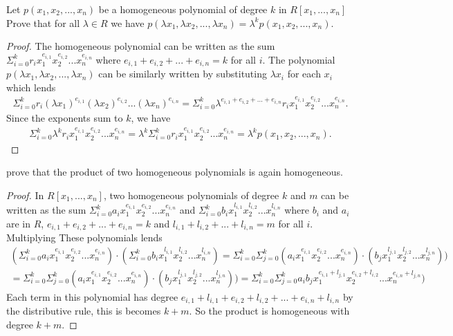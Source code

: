 \documentclass[10pt]{article}
\newenvironment{problem}[2][Problem]{\begin{trivlist}
		\item[\hskip \labelsep {\bfseries #1}\hskip \labelsep {\bfseries #2.}]}{\end{trivlist}}
\begin{document}
	\begin{problem}{1.15}
		Let $p(x_1, x_2, ..., x_n)$ be a homogeneous polynomial of degree $k$ in $R[x_1, ..., x_n]$ Prove that for all $
		\lambda \in R$ we have $p(\lambda x_1, \lambda x_2, ..., \lambda x_n) = \lambda^k p(x_1, x_2, ..., x_n)$.
		
		\begin{proof}
			The homogeneous polynomial can be written as the sum $\Sigma^k_{i=0} r_i x_1^{e_{i,1}} x_2^{e_{i,2}} ... x_n^{e_{i,n}}$ where ${e_{i,1}} + {e_{i,2}} + ... + {e_{i,n}} = k$ for all $i$. The polynomial $p(\lambda x_1, \lambda x_2, ..., \lambda x_n)$ can be similarly written by substituting $\lambda x_i$ for each $x_i$ which lends 
			\begin{align*}
				\Sigma^k_{i=0} r_i (\lambda x_1)^{e_{i,1}} (\lambda x_2)^{e_{i,2}} ... (\lambda x_n)^{e_{i,n}} = \Sigma^k_{i=0} \lambda^{e_{i,1} + e_{i,2} +...+e_{i,n}} r_i x_1^{e_{i,1}} x_2^{e_{i,2}} ... x_n^{e_{i,n}}.
			\end{align*}
			 Since the exponents sum to $k$, we have 
			 \begin{align*}
			 	\Sigma^k_{i=0} \lambda^{k} r_i x_1^{e_{i,1}} x_2^{e_{i,2}} ... x_n^{e_{i,n}} = \lambda^{k} \Sigma^k_{i=0} r_i x_1^{e_{i,1}} x_2^{e_{i,2}} ... x_n^{e_{i,n}} = \lambda^k p(x_1, x_2, ..., x_n).
			 \end{align*}
		\end{proof}
	\end{problem}
	
	\begin{problem}{1.16}
		prove that the product of two homogeneous polynomials is again homogeneous.
		\begin{proof}
			In $R[x_1, ..., x_n]$, two homogeneous polynomials of degree $k$ and $m$ can be written as the sum $\Sigma^k_{i=0} a_i x_1^{e_{i,1}} x_2^{e_{i,2}} ... x_n^{e_{i,n}}$ and $\Sigma^k_{i=0} b_i x_1^{l_{i,1}} x_2^{l_{i,2}} ... x_n^{l_{i,n}}$ where $b_i$ and $a_i$ are in $R$, $e_{i,1} + e_{i,2} + ... + e_{i,n} = k$ and $l_{i,1} + l_{i,2} + ... + l_{i,n} = m$ for all $i$. Multiplying These polynomials lends
			\begin{align*}
				(\Sigma^k_{i=0} a_i x_1^{e_{i,1}} x_2^{e_{i,2}} ... x_n^{e_{i,n}}) \cdot (\Sigma^k_{i=0} b_i x_1^{l_{i,1}} x_2^{l_{i,2}} ... x_n^{l_{i,n}}) = \Sigma^k_{i=0} \Sigma^k_{j=0} (a_i x_1^{e_{i,1}} x_2^{e_{i,2}} ... x_n^{e_{i,n}}) \cdot (b_j x_1^{l_{j,1}} x_2^{l_{j,2}} ... x_n^{l_{j,n}}))
			\end{align*}
			\begin{align*}
				= \Sigma^k_{i=0} \Sigma^k_{j=0} (a_i x_1^{e_{i,1}} x_2^{e_{i,2}} ... x_n^{e_{i,n}}) \cdot (b_j x_1^{l_{j,1}} x_2^{l_{j,2}} ... x_n^{l_{j,n}})) = \Sigma^k_{i=0} \Sigma^k_{j=0} a_i b_j x_1^{e_{i,1} + l_{j,1}} x_2^{e_{i,2} + l_{i,2}} ... x_n^{e_{i,n} + l_{j,n}})
			\end{align*}
			Each term in this polynomial has degree $e_{i,1} + l_{i,1} + e_{i,2} + l_{i,2} + ... + e_{i,n} + l_{i,n}$ by the distributive rule, this is becomes $k+m$. So the product is homogeneous with degree $k+m$.
		\end{proof}
	\end{problem}
	
\end{document}
